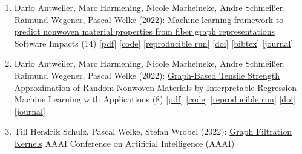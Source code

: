\documentclass{scrartcl}
\begin{document}
\begin{enumerate}
Machine Learning (111)\newline
{\footnotesize
[\href{https://pwelke.github.io/publications/schulz2022mach.pdf}{pdf}]
[\href{https://github.com/mlai-bonn/GenWL}{code}]
[\href{https://dx.doi.org/10.1007/s10994-022-06131-w}{doi}]
[\href{https://arxiv.org/abs/2101.08104}{arxiv}]
[\href{https://dblp.org/rec/journals/ml/SchulzHWW22.bib}{bibtex}]
[\href{https://www.springer.com/journal/10994}{journal}]
}
\item
\label{antweiler2022softwareimpacts}
Dario Antweiler, Marc Harmening, Nicole Marheineke, Andre Schmeißer, Raimund Wegener, Pascal Welke (2022):\newline
\href{https://dx.doi.org/10.1016/j.simpa.2022.100423}{Machine learning framework to predict nonwoven material properties
from fiber graph representations}\newline
Software Impacts (14)\newline
{\footnotesize
[\href{https://pwelke.github.io/publications/antweiler2022softwareimpacts.pdf}{pdf}]
[\href{https://github.com/pwelke/random-nonwoven-fibers}{code}]
[\href{https://codeocean.com/capsule/7514050/tree/v1}{reproducible run}]
[\href{https://dx.doi.org/10.1016/j.simpa.2022.100423}{doi}]
[\href{https://dblp.org/rec/journals/simpa/AntweilerHMSWW22.bib}{bibtex}]
[\href{https://www.sciencedirect.com/journal/software-impacts}{journal}]
}
\item
\label{antweiler2022graphbased}
Dario Antweiler, Marc Harmening, Nicole Marheineke, Andre Schmeißer, Raimund Wegener, Pascal Welke (2022):\newline
\href{https://dx.doi.org/10.1016/j.mlwa.2022.100288}{Graph-Based Tensile Strength Approximation of Random Nonwoven Materials by Interpretable Regression}\newline
Machine Learning with Applications (8)\newline
{\footnotesize
[\href{https://pwelke.github.io/publications/antweiler2022mlwa.pdf}{pdf}]
[\href{https://github.com/pwelke/random-nonwoven-fibers}{code}]
[\href{https://codeocean.com/capsule/4908297/tree/v1}{reproducible run}]
[\href{https://dx.doi.org/10.1016/j.mlwa.2022.100288}{doi}]
[\href{https://www.journals.elsevier.com/machine-learning-with-applications}{journal}]
}
\item
\label{schulz2022aaai}
Till Hendrik Schulz, Pascal Welke, Stefan Wrobel (2022):\newline
\href{https://dx.doi.org/10.1609/aaai.v36i8.20793}{Graph Filtration Kernels}\newline
AAAI Conference on Artificial Intelligence (AAAI)\newline

\end{enumerate}
\end{document}
